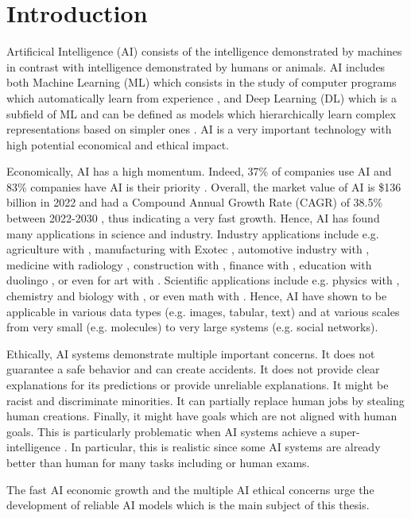 \chapter{Introduction}
\label{chap:introduction}

Artificical Intelligence (AI) consists of the intelligence demonstrated by machines in contrast with intelligence demonstrated by humans or animals.
AI includes both Machine Learning (ML) which consists in the study of computer programs which automatically learn from experience \citep{Mitchell97}, and Deep Learning (DL) which is a subfield of ML and can be defined as models which hierarchically learn complex representations based on simpler ones \citep{GoodBengCour16}.
AI is a very important technology with high potential economical and ethical impact. 

Economically, AI has a high momentum. Indeed, 37\% of companies use AI  and 83\% companies have AI is their priority . Overall, the market value of AI is \$136 billion in 2022  and had a Compound Annual Growth Rate (CAGR) of 38.5\% between 2022-2030 , thus indicating a very fast growth.
Hence, AI has found many applications in science and industry. 
Industry applications include e.g. agriculture with , manufacturing with Exotec , automotive industry with , medicine with radiology , construction with , finance with , education with duolingo , or even for art with .
Scientific applications include e.g. physics with , chemistry and biology with , or even math with .
Hence, AI have shown to be applicable in various data types (e.g. images, tabular, text) and at various scales from very small (e.g. molecules) to very large systems (e.g. social networks).

Ethically, AI systems demonstrate multiple important concerns.
It does not guarantee a safe behavior and can create accidents.
It does not provide clear explanations for its predictions or provide unreliable explanations.
It might be racist and discriminate minorities.
It can partially replace human jobs by stealing human creations.
Finally, it might have goals which are not aligned with human goals. This is particularly problematic when AI systems achieve a super-intelligence . In particular, this is realistic since some AI systems are already better than human for many tasks including  or human exams.

The fast AI economic growth and the multiple AI ethical concerns urge the development of reliable AI models which is the main subject of this thesis.


